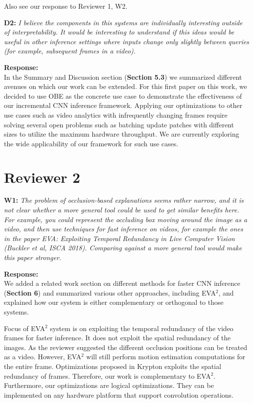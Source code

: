 \documentclass[preprint]{vldb}
\begin{document}
Also see our response to Reviewer 1, W2.

\vspace{2mm}
\noindent \textbf{D2:} \textit{I believe the components in this systems are individually interesting outside of interpretability. It would be interesting to understand if this ideas would be useful in other inference settings where inputs change only slightly between queries (for example, subsequent frames in a video).}

\vspace{2mm}
\noindent \textbf{Response:} \\
In the Summary and Discussion section (\textbf{Section 5.3}) we summarized different avenues on which our work can be extended.
For this first paper on this work, we decided to use OBE as the concrete use case to demonstrate the effectiveness of our incremental CNN inference framework.
Applying our optimizations to other use cases such as video analytics with infrequently changing frames require solving several open problems such as batching update patches with different sizes to utilize the maximum hardware throughput.
We are currently exploring the wide applicability of our framework for such use cases.


\section{Reviewer 2}

\vspace{2mm}
\noindent \textbf{W1:} \textit{The problem of occlusion-based explanations seems rather narrow, and it is not clear whether a more general tool could be used to get similar benefits here. For example, you could represent the occluding box moving around the image as a video, and then use techniques for fast inference on videos, for example the ones in the paper EVA: Exploiting Temporal Redundancy in Live Computer Vision (Buckler et al, ISCA 2018). Comparing against a more general tool would make this paper stronger.}

\vspace{2mm}
\noindent \textbf{Response:}\\
We added a related work section on different methods for faster CNN inference (\textbf{Section 6}) and summarized various other approaches, including EVA$^2$, and explained how our system is either complementary or orthogonal to those systems.

Focus of EVA$^2$ system is on exploiting the temporal redundancy of the video frames for faster inference. It does not exploit the spatial redundancy of the images. As the reviewer suggested the different occlusion positions can be treated as a video. However, EVA$^2$ will still perform motion estimation computations for the entire frame. Optimizations proposed in Krypton exploits the spatial redundancy of frames. Therefore, our work is complementary to EVA$^2$.
Furthermore, our optimizations are logical optimizations. They can be implemented on any hardware platform that support convolution operations.
\end{document}
